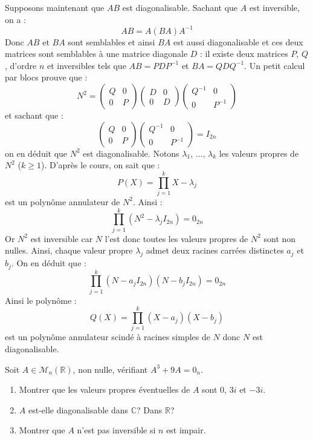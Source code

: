 \documentclass[a4paper,10pt]{report}
\begin{document}
\begin{enumerate}
\noindent Supposons maintenant que $AB$ est diagonalisable. Sachant que $A$ est inversible, on a :
$$ AB=A(BA)A^{-1}$$
Donc $AB$ et $BA$ sont semblables et ainsi $BA$ est aussi diagonalisable et ces deux matrices sont semblables à une matrice diagonale $D$ : il existe deux matrices $P$, $Q$, d'ordre $n$ et inversibles tels que $AB=PDP^{-1}$ et $BA= QDQ^{-1}$. Un petit calcul par blocs prouve que :
$$ N^2 = \begin{pmatrix}
Q & 0 \\
0 & P
\end{pmatrix} \begin{pmatrix}
D & 0 \\
0 & D
\end{pmatrix} \begin{pmatrix}
Q^{-1} & 0 \\
0 & P^{-1}
\end{pmatrix}$$
et sachant que :
$$ \begin{pmatrix}
Q & 0 \\
0 & P
\end{pmatrix} \begin{pmatrix}
Q^{-1} & 0 \\
0 & P^{-1}
\end{pmatrix} = I_{2n}$$
on en déduit que $N^2$ est diagonalisable. Notons $\lambda_1$, $\ldots$, $\lambda_k$ les valeurs propres de $N^2$ ($k \geq 1$). D'après le cours, on sait que :
$$ P(X) = \prod_{j=1}^k X- \lambda_j$$
est un polynôme annulateur de $N^2$. Ainsi :
$$ \prod_{j=1} ^k (N^2- \lambda_j I_{2n}) = 0_{2n}$$
Or $N^2$ est inversible car $N$ l'est donc toutes les valeurs propres de $N^2$ sont non nulles. Ainsi, chaque valeur propre $\lambda_j$ admet deux racines carrées distinctes $a_j$ et $b_j$. On en déduit que :
$$ \prod_{j=1} ^k (N- a_j I_{2n})(N - b_j I_{2n}) = 0_{2n}$$
Ainsi le polynôme :
$$ Q(X) = \prod_{j=1}^k (X-a_j)(X- b_j)$$
est un polynôme annulateur scindé à racines simples de $N$ donc $N$ est diagonalisable.
\end{enumerate}

\begin{Exercice}{} Soit $A \in \mathcal{M}_n(\mathbb{R})$, non nulle, vérifiant $A^3+9A=0_n$.
\begin{enumerate}
\item Montrer que les valeurs propres éventuelles de $A$ sont $0$, $3i$ et $-3i$.
\item $A$ est-elle diagonalisable dans $\mathbb{C}$? Dans $\mathbb{R}$?
\item Montrer que $A$ n'est pas inversible si $n$ est impair. 
\end{enumerate}
\end{Exercice}
\end{document}
